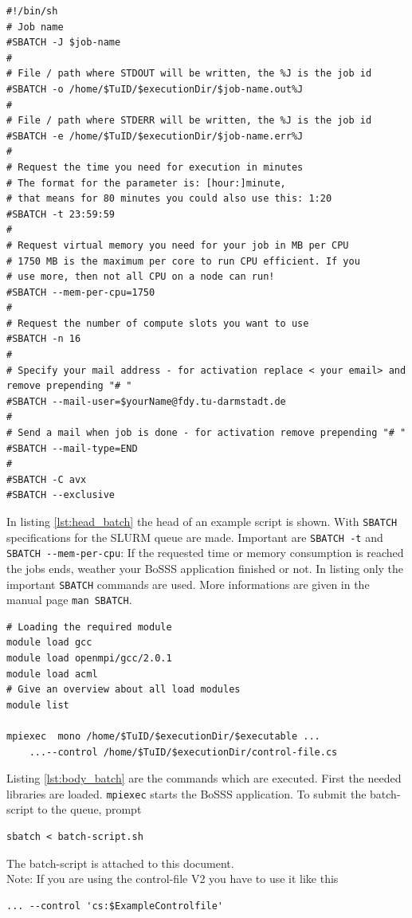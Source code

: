 \documentclass[11pt,twoside,a4paper]{fdyartcl}
\begin{document}
\noindent
\begin{minipage}{\linewidth}
\begin{lstlisting}[caption={Batch-script: head}, 
label={lst:head_batch}]
#!/bin/sh
# Job name
#SBATCH -J $job-name
#
# File / path where STDOUT will be written, the %J is the job id
#SBATCH -o /home/$TuID/$executionDir/$job-name.out%J
#
# File / path where STDERR will be written, the %J is the job id
#SBATCH -e /home/$TuID/$executionDir/$job-name.err%J
#
# Request the time you need for execution in minutes
# The format for the parameter is: [hour:]minute,
# that means for 80 minutes you could also use this: 1:20
#SBATCH -t 23:59:59
#
# Request virtual memory you need for your job in MB per CPU
# 1750 MB is the maximum per core to run CPU efficient. If you
# use more, then not all CPU on a node can run!
#SBATCH --mem-per-cpu=1750
#
# Request the number of compute slots you want to use
#SBATCH -n 16
#
# Specify your mail address - for activation replace < your email> and remove prepending "# "
#SBATCH --mail-user=$yourName@fdy.tu-darmstadt.de
#
# Send a mail when job is done - for activation remove prepending "# "
#SBATCH --mail-type=END
#
#SBATCH -C avx
#SBATCH --exclusive
\end{lstlisting}

\end{minipage}


In listing \ref{lst:head_batch} the head of an example script is shown. With \verb|SBATCH| specifications for the SLURM queue are made. Important are \verb|SBATCH -t| and \verb|SBATCH --mem-per-cpu|: If the requested time or memory consumption is reached the jobs ends, weather your BoSSS application finished or not. In listing only the important \verb|SBATCH| commands are used. More informations are given in the manual page \verb|man SBATCH|.

\noindent
\begin{minipage}{\linewidth}
\begin{lstlisting}[caption={Batch-script: body}, 
label={lst:body_batch}]
# Loading the required module
module load gcc
module load openmpi/gcc/2.0.1
module load acml
# Give an overview about all load modules
module list

mpiexec  mono /home/$TuID/$executionDir/$executable ...
	...--control /home/$TuID/$executionDir/control-file.cs
\end{lstlisting}
\end{minipage}

Listing \ref{lst:body_batch} are the commands which are executed. First the needed libraries are loaded. \verb|mpiexec| starts the BoSSS application. To submit the batch-script to the queue, prompt
\begin{verbatim}
sbatch < batch-script.sh
\end{verbatim}
The batch-script is attached to this document.\\
Note: If you are using the control-file V2 you have to use it like this
\begin{verbatim}
... --control 'cs:$ExampleControlfile' 
\end{verbatim}
\end{document}
